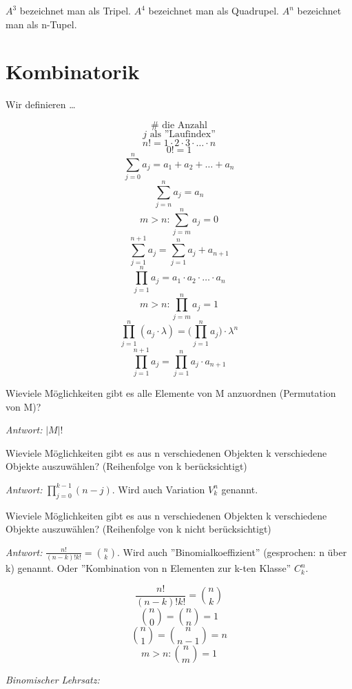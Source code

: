 \documentclass[11pt,a4paper,twocolumn]{article}
\theoremstyle{area}
\begin{document}
$A^3$ bezeichnet man als Tripel. $A^4$ bezeichnet man als Quadrupel.
$A^n$ bezeichnet man als n-Tupel.

\section{Kombinatorik}

Wir definieren \dots

\[
    \# \text{ die Anzahl}
\] \[
    j \text{ als ''Laufindex''}
\]
\begin{equation}
    n! = 1 \cdot 2 \cdot 3 \cdot \ldots \cdot n
\end{equation}
\[
    0! = 1
\]
\begin{equation}
    \sum_{j=0}^n a_j = a_1 + a_2 + \ldots + a_n
\end{equation}
\[
    \sum_{j=n}^n a_j = a_n
\] \[
    m > n: \sum_{j=m}^n a_j = 0
\] \[
    \sum_{j=1}^{n+1} a_j = \sum_{j=1}^{n} a_j + a_{n+1}
\]
\begin{equation}
    \prod_{j=1}^n a_j = a_1 \cdot a_2 \cdot \ldots \cdot a_n
\end{equation}
\[
    m > n: \prod_{j=m}^n a_j = 1
\] \[
    \prod_{j=1}^n (a_j \cdot \lambda)
        = \Big(\prod_{j=1}^n a_j\Big) \cdot \lambda^n
\] \[
    \prod_{j=1}^{n+1} a_j = \prod_{j=1}^{n} a_j \cdot a_{n+1}
\]

Wieviele Möglichkeiten gibt es alle Elemente von M anzuordnen
(Permutation von M)?

\emph{Antwort:} $| M |!$

Wieviele Möglichkeiten gibt es aus n verschiedenen Objekten k
verschiedene Objekte auszuwählen? (Reihenfolge von k berücksichtigt)

\emph{Antwort:} $\prod_{j=0}^{k-1} (n-j)$. Wird auch Variation
$V_k^n$ genannt.

Wieviele Möglichkeiten gibt es aus n verschiedenen Objekten k
verschiedene Objekte auszuwählen? (Reihenfolge von k nicht
berücksichtigt)

\emph{Antwort:} $\frac{n!}{(n-k)! k!} = \binom{n}{k}$. Wird auch
''Binomialkoeffizient'' (gesprochen: n über k) genannt. Oder
''Kombination von n Elementen zur k-ten Klasse'' $C_k^n$.

\begin{equation}
    \frac{n!}{(n-k)! k!} = \binom{n}{k}
\end{equation}
\[
    \binom{n}{0} = \binom{n}{n} = 1
\] \[
    \binom{n}{1} = \binom{n}{n-1} = n
\] \[
    m > n: \binom{n}{m} = 1
\]

\emph{Binomischer Lehrsatz:}
\end{document}
